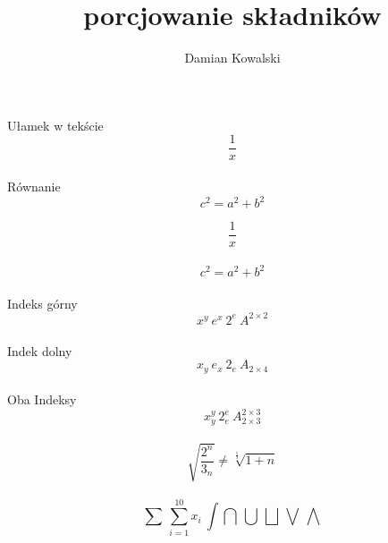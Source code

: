 \documentclass[12pt, letterpaper, titlepage]{article}
\title{porcjowanie składników}
\author{Damian Kowalski}
\begin{document}
\maketitle

\newpage
\centering
Ułamek w tekście
$$ \frac{1} {x} $$\\
Równanie
$$ c^{2}=a^{2}+b^{2} $$

\begin{equation}
\frac{1}{x}
\end{equation}
\\
\begin{equation}
c^{2}=a^{2}+b^{2}
\end{equation}
\\
Indeks górny
$$ x^{y} \ e^{x} \ 2^{e} \ A^{2 \times 2} $$\\
Indek dolny
$$ x_{y} \ e_{x} \ 2_{e} \ A_{2 \times 4} $$\\
Oba Indeksy
$$ x_{y}^{y} \ 2_{e}^{e} \ A_{2 \times 3}^{2 \times 3} $$\\

$$ \sqrt{ \frac{2^{n}}{3_{n}}} \neq \sqrt[\frac{1}{3}]{1+n} $$\\

$$ \sum \ \sum_{i=1}^{10}x_i \ \int \bigcap \ \bigcup \ \bigsqcup \ \bigvee \ \bigwedge $$
\end{document}
